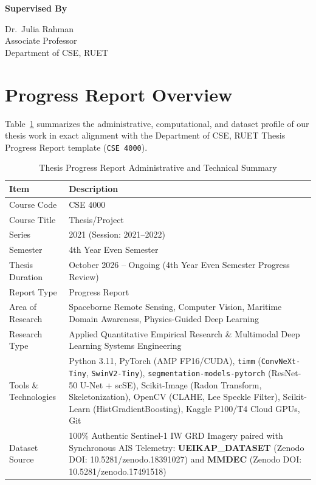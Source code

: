 \documentclass[11pt,a4paper]{article}
\begin{document}
\begin{titlepage}
\begin{center}
    \vfill
    {\fontsize{12}{15}\selectfont\bfseries Supervised By\par}
    \vspace{4pt}
    {\fontsize{11}{14}\selectfont
    Dr.\ Julia Rahman\\
    Associate Professor\\
    Department of CSE, RUET\par}
\end{center}
\end{titlepage}

\section*{Progress Report Overview}

Table~\ref{tab:overview} summarizes the administrative, computational, and dataset profile of our thesis work in exact alignment with the Department of CSE, RUET Thesis Progress Report template (\texttt{CSE 4000}).

\begin{table}[H]
\centering
\caption{Thesis Progress Report Administrative and Technical Summary}
\label{tab:overview}
\begin{tabularx}{\textwidth}{|l|X|}
\hline
\rowcolor{ruetgray}
\textbf{Item} & \textbf{Description} \\ \hline
Course Code & CSE 4000 \\ \hline
Course Title & Thesis/Project \\ \hline
Series & 2021 (Session: 2021--2022) \\ \hline
Semester & 4th Year Even Semester \\ \hline
Thesis Duration & October 2026 -- Ongoing (4th Year Even Semester Progress Review) \\ \hline
Report Type & Progress Report \\ \hline
Area of Research & Spaceborne Remote Sensing, Computer Vision, Maritime Domain Awareness, Physics-Guided Deep Learning \\ \hline
Research Type & Applied Quantitative Empirical Research \& Multimodal Deep Learning Systems Engineering \\ \hline
Tools \& Technologies & Python 3.11, PyTorch (AMP FP16/CUDA), \texttt{timm} (\texttt{ConvNeXt-Tiny}, \texttt{SwinV2-Tiny}), \texttt{segmentation-models-pytorch} (ResNet-50 U-Net + scSE), Scikit-Image (Radon Transform, Skeletonization), OpenCV (CLAHE, Lee Speckle Filter), Scikit-Learn (HistGradientBoosting), Kaggle P100/T4 Cloud GPUs, Git \\ \hline
Dataset Source & 100\% Authentic Sentinel-1 IW GRD Imagery paired with Synchronous AIS Telemetry: \textbf{UEIKAP\_DATASET} (Zenodo DOI: 10.5281/zenodo.18391027) and \textbf{MMDEC} (Zenodo DOI: 10.5281/zenodo.17491518) \\ \hline
\end{tabularx}
\end{table}
\end{document}
